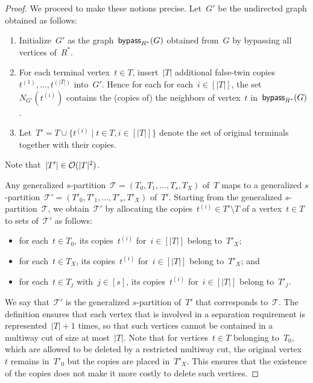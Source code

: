 \begin{proof}

We proceed to make these notions precise. Let~$G'$ be the undirected graph obtained as follows:
\begin{enumerate}
	\item Initialize~$G'$ as the graph~$\mathsf{bypass}_{R^*}(G)$ obtained from~$G$ by bypassing all vertices of~$R^*$.
	\item For each terminal vertex~$t \in T$, insert~$|T|$ additional false-twin copies~$t^{(1)}, \ldots, t^{(|T|)}$ into~$G'$. Hence for each for each~$i \in [|T|]$, the set~$N_{G'}(t^{(i)})$ contains the (copies of) the neighbors of vertex~$t$ in~$\mathsf{bypass}_{R^*}(G)$. 
	\item Let~$T' = T \cup \{ t^{(i)} \mid t \in T, i \in [|T|]\}$ denote the set of original terminals together with their copies. 
\end{enumerate}
Note that~$|T'| \in \mathcal{O}(|T|^2)$.

Any generalized $s$-partition~$\mathcal{T} = (T_0, T_1, \ldots, T_s, T_X)$ of~$T$ maps to a generalized $s$-partition~$\mathcal{T}' = (T'_0, T'_1, \ldots, T'_s, T'_X)$ of~$T'$. Starting from the generalized $s$-partition~$\mathcal{T}$, we obtain~$\mathcal{T}'$ by allocating the copies~$t^{(i)} \in T' \setminus T$ of a vertex~$t \in T$ to sets of~$\mathcal{T}'$ as follows:
\begin{itemize}
	\item for each~$t \in T_0$, its copies~$t^{(i)}$ for~$i \in [|T|]$ belong to~$T'_X$;
	\item for each~$t \in T_X$, its copies~$t^{(i)}$ for~$i \in [|T|]$ belong to~$T'_X$; and
	\item for each~$t \in T_j$ with~$j \in [s]$, its copies~$t^{(i)}$ for~$i \in [|T|]$ belong to~$T'_j$.
\end{itemize}
We say that~$\mathcal{T}'$ is the generalized $s$-partition of~$T'$ that corresponds to~$\mathcal{T}$. The definition ensures that each vertex that is involved in a separation requirement is represented~$|T|+1$ times, so that such vertices cannot be contained in a multiway cut of size at most~$|T|$. Note that for vertices~$t \in T$ belonging to~$T_0$, which are allowed to be deleted by a restricted multiway cut, the original vertex~$t$ remains in~$T'_0$ but the copies are placed in~$T'_X$. This ensures that the existence of the copies does not make it more costly to delete such vertices.


\end{proof}
